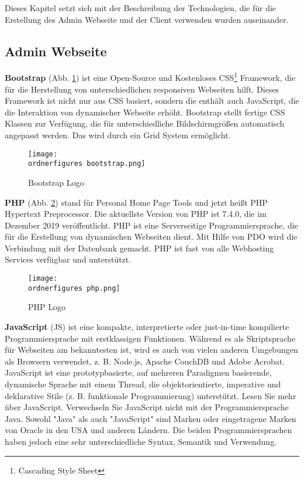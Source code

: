 Dieses Kapitel setzt sich mit der Beschreibung der Technologien, die f\"{u}r die Erstellung des Admin Webseite und der Client verwenden wurden auseinander. 


\subsection{Admin Webseite}
\textbf{Bootstrap} (Abb. \ref{fi:bootstrap})
ist eine Open-Source und Kostenloses CSS\footnote{Cascading Style Sheet} Framework, die f\"{u}r die Herstellung von unterschiedlichen responsiven Webseiten hilft. Dieses Framework ist nicht nur aus CSS basiert, sondern die enth\"{a}lt auch JavaScript, die die Interaktion von dynamischer Webseite erh\"{o}ht. Bootstrap stellt fertige CSS Klassen zur Verf\"{u}gung, die f\"{u}r unterschiedliche Bildschirmgr\"{o}\ss{}en automatisch angepasst werden. Das wird durch ein Grid System erm\"{o}glicht.

\begin{figure}[h!]
	\centering
	\texttt{[image: \\ordnerfigures bootstrap.png]}
	\caption{Bootstrap Logo}
	\label{fi:bootstrap}
\end{figure}

\textbf{PHP} (Abb. \ref{fi:php})
stand f\"{u}r Personal Home Page Tools und jetzt hei\ss{}t PHP Hypertext Preprocessor. Die aktuellste Version von PHP ist 7.4.0, die im Dezember 2019 ver\"{o}ffentlicht. PHP ist eine Serverseitige Programmiersprache, die f\"{u}r die Erstellung von dynamischen Webseiten dient. Mit Hilfe von PDO wird die Verbindung mit der Datenbank gemacht. PHP ist fast von alle Webhosting Services verf\"{u}gbar und unterst\"{u}tzt.

\begin{figure}[h!]
	\centering
	\texttt{[image: \\ordnerfigures php.png]}
	\caption{PHP Logo}
	\label{fi:php}
\end{figure}



\textbf{JavaScript} 
(JS) ist eine kompakte, interpretierte oder just-in-time kompilierte Programmiersprache mit erstklassigen Funktionen. W\"{a}hrend es als Skriptsprache f\"{u}r Webseiten am bekanntesten ist, wird es auch von vielen anderen Umgebungen als Browsern verwendet, z. B. Node.js, Apache CouchDB und Adobe Acrobat. JavaScript ist eine prototypbasierte, auf mehreren Paradigmen basierende, dynamische Sprache mit einem Thread, die objektorientierte, imperative und deklarative Stile (z. B. funktionale Programmierung) unterst\"{u}tzt. Lesen Sie mehr \"{u}ber JavaScript.
Verwechseln Sie JavaScript nicht mit der Programmiersprache Java. Sowohl "Java" als auch "JavaScript" sind Marken oder eingetragene Marken von Oracle in den USA und anderen L\"{a}ndern. Die beiden Programmiersprachen haben jedoch eine sehr unterschiedliche Syntax, Semantik und Verwendung.

